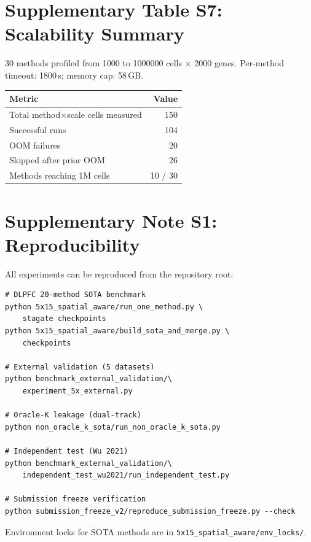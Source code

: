 \documentclass[11pt]{article}
\begin{document}
\section*{Supplementary Table S7: Scalability Summary}

30 methods profiled from \num{1000} to \num{1000000} cells
$\times$ 2000 genes. Per-method timeout: 1800\,s; memory cap: 58\,GB.

\begin{tabular}{@{}lr@{}}
\toprule
Metric & Value \\
\midrule
Total method$\times$scale cells measured & 150 \\
Successful runs & 104 \\
OOM failures & 20 \\
Skipped after prior OOM & 26 \\
Methods reaching 1M cells & 10 / 30 \\
\bottomrule
\end{tabular}

\section*{Supplementary Note S1: Reproducibility}

All experiments can be reproduced from the repository root:

\begin{verbatim}
# DLPFC 20-method SOTA benchmark
python 5x15_spatial_aware/run_one_method.py \
    stagate checkpoints
python 5x15_spatial_aware/build_sota_and_merge.py \
    checkpoints

# External validation (5 datasets)
python benchmark_external_validation/\
    experiment_5x_external.py

# Oracle-K leakage (dual-track)
python non_oracle_k_sota/run_non_oracle_k_sota.py

# Independent test (Wu 2021)
python benchmark_external_validation/\
    independent_test_wu2021/run_independent_test.py

# Submission freeze verification
python submission_freeze_v2/reproduce_submission_freeze.py --check
\end{verbatim}

Environment locks for SOTA methods are in
\texttt{5x15\_spatial\_aware/env\_locks/}.
\end{document}
